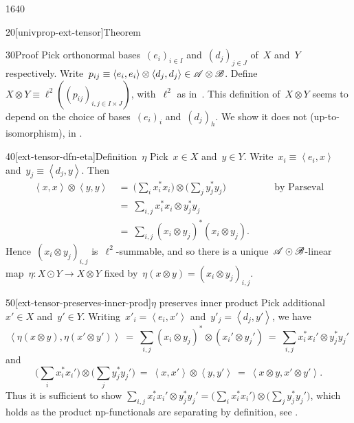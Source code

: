 \begin{parsec}{1640}
\begin{point}{20}[univprop-ext-tensor]{Theorem}
\begin{enumerate}
\end{enumerate}
\begin{point}{30}{Proof}%
Pick orthonormal bases~$(e_i)_{i \in I}$ and~$(d_j)_{j \in J}$ of~$X$
    and~$Y$ respectively.
Write~$p_{ij} \equiv \left<e_i, e_i\right>\otimes \left<d_j,d_j\right>
    \in \mathscr{A} \otimes \mathscr{B}$.
Define~$X \otimes Y \equiv \ell^2((p_{ij})_{i,j \in I\times J})$,
    with~$\ell^2$ as in~.
This definition of~$X \otimes Y$ seems to depend
    on the choice of bases~$(e_i)_i$ and~$(d_j)_h$.
    We show it does not (up-to-isomorphism), in .
\begin{point}{40}[ext-tensor-dfn-eta]{Definition~$\eta$}%
Pick~$x \in X$ and~$y \in Y$.
Write~$x_i \equiv \left<e_i, x\right>$
and~$y_j \equiv \left<d_j, y\right>$.
Then
\begin{align*}
    \left<x,x\right> \otimes \left<y,y\right>
    &\ = \ \bigl( \sum_i x_i^*x_i\bigr) \otimes\bigl(\sum_jy_j^*y_j\bigr)
            &\quad&\text{by Parseval}  \\
            &\ = \ \sum_{i,j}  x_i^*x_i  \otimes y_j^*y_j \\
            &\ = \ \sum_{i,j}  (x_i \otimes y_j)^* (x_i  \otimes y_j).
\end{align*}
Hence~$(x_i \otimes y_j)_{i,j}$ is~$\ell^2$-summable,
    and so there is a unique~$\mathscr{A} \odot\mathscr{B}$-linear
    map~$\eta\colon X \odot Y \to X \otimes Y$ fixed
    by~$\eta(x \otimes y) = (x_i \otimes y_j)_{i,j}$.
\end{point}
\begin{point}{50}[ext-tensor-preserves-inner-prod]{$\eta$ preserves inner product}%
Pick additional~$x' \in X$ and~$y' \in Y$.
Writing~$x'_i = \left<e_i,x'\right>$
    and~$y'_j = \left<d_j, y'\right>$,
we have
\begin{equation*}
    \left<\eta(x\otimes y), \eta(x' \otimes y')\right>
    \ = \ \sum_{i,j} (x_i\otimes y_j)^* \otimes (x_i' \otimes y_j')
    \ = \ \sum_{i,j} x_i^*x_i' \otimes y_j^* y_j'
\end{equation*}
and
\begin{equation*}
    \bigl(\sum_i x_i^*x_i'\bigr) \otimes \bigl( \sum_j y_j^* y_j' \bigr)
    \ = \ \left<x,x'\right> \otimes \left<y,y'\right>
    \ = \ \left<x\otimes y,x' \otimes y'\right> .
\end{equation*}
Thus it is sufficient to show
    $\sum_{i,j} x_i^*x_i' \otimes y_j^* y_j'
    = \bigl(\sum_i x_i^*x_i'\bigr) \otimes \bigl( \sum_j y_j^* y_j' \bigr)$,
    which holds as the product np-functionals
    are separating by definition, see .

\end{point}
\end{point}
\end{point}
\end{parsec}
